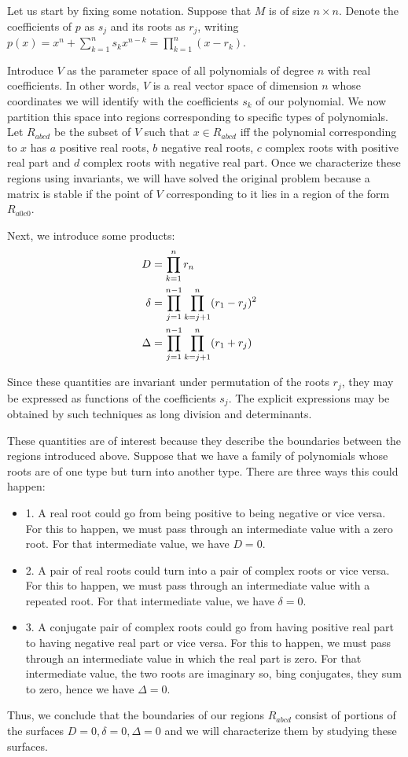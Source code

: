 \documentclass{amsart}
\theoremstyle{definition}
\theoremstyle{remark}
\numberwithin{equation}{section}
\begin{document}
Let us start by fixing some notation.  Suppose that $M$ is of size $n
\times n$.  Denote the coefficients of $p$ as $s_j$ and its roots as
$r_j$, writing $p(x) = x^n + \sum_{k=1}^n s_k x^{n-k} = \prod_{k=1}^n
(x-r_k)$.

Introduce $V$ as the parameter space of all polynomials of degree $n$
with real coefficients.  In other words, $V$ is a real vector space of
dimension $n$ whose coordinates we will identify with the coefficients
$s_k$ of our polynomial.  We now partition this space into regions
corresponding to specific types of polynomials.  Let $R_{abcd}$ be the
subset of $V$ such that $x \in R_{abcd}$ iff the polynomial
corresponding to $x$ has $a$ positive real roots, $b$ negative real
roots, $c$ complex roots with positive real part and $d$ complex roots
with negative real part.  Once we characterize these regions using
invariants, we will have solved the original problem because a matrix
is stable if the point of $V$ corresponding to it lies in a region of
the form $R_{a0c0}$.

Next, we introduce some products:
\begin{align}
D &= \prod_{k=1}^n r_n \cr
\delta &= \prod_{j=1}^{n-1} \prod_{k=j+1}^n (r_1 - r_j)^2 \cr
\Delta &= \prod_{j=1}^{n-1} \prod_{k=j+1}^n (r_1 + r_j) \cr
\end{align}

Since these quantities are invariant under permutation of the roots
$r_j$, they may be expressed as functions of the coefficients $s_j$.
The explicit expressions may be obtained by such techniques as long
division and determinants.

These quantities are of interest because they describe the boundaries
between the regions introduced above.  Suppose that we have a family
of polynomials whose roots are of one type but turn into another type.
There are three ways this could happen:
\begin{itemize}
\item{1.} A real root could go from being positive to being negative
  or vice versa.  For this to happen, we must pass through an
  intermediate value with a zero root.  For that intermediate value,
  we have $D = 0$.
\item{2.} A pair of real roots could turn into a pair of complex roots
  or vice versa.  For this to happen, we must pass through an
  intermediate value with a repeated root.  For that intermediate
  value, we have $\delta = 0$.
\item{3.} A conjugate pair of complex roots could go from having
  positive real part to having negative real part or vice versa.  For
  this to happen, we must pass through an intermediate value in which
  the real part is zero.  For that intermediate value, the two roots
  are imaginary so, bing conjugates, they sum to zero, hence we have
  $\Delta = 0$.
\end{itemize}
\noindent  Thus, we conclude that the boundaries of our regions
$R_{abcd}$ consist of portions of the surfaces $D=0, \delta=0,
\Delta=0$ and we will characterize them by studying these surfaces.
\end{document}
